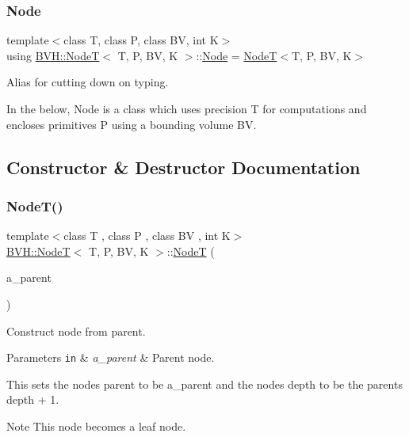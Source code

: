 \subsubsection{\texorpdfstring{Node}{Node}}
{\footnotesize\ttfamily template$<$class T, class P, class BV, int K$>$ \\
using \hyperlink{classBVH_1_1NodeT}{B\+V\+H\+::\+NodeT}$<$ T, P, BV, K $>$\+::\hyperlink{classBVH_1_1NodeT_ac52d9b56f082002c7f8be91062c40ff8}{Node} =  \hyperlink{classBVH_1_1NodeT}{NodeT}$<$T, P, BV, K$>$}



Alias for cutting down on typing. 

In the below, \textquotesingle{}Node\textquotesingle{} is a class which uses precision T for computations and encloses primitives P using a bounding volume BV. 

\subsection{Constructor \& Destructor Documentation}
\mbox{\label{classBVH_1_1NodeT_a8867e5e1c47d12eff7a468b2e240f16b}} 
\subsubsection{\texorpdfstring{Node\+T()}{NodeT()}\hspace{0.1cm}{\footnotesize\ttfamily [1/3]}}
{\footnotesize\ttfamily template$<$class T , class P , class BV , int K$>$ \\
\hyperlink{classBVH_1_1NodeT}{B\+V\+H\+::\+NodeT}$<$ T, P, BV, K $>$\+::\hyperlink{classBVH_1_1NodeT}{NodeT} (\begin{DoxyParamCaption}\item[{const \hyperlink{classBVH_1_1NodeT_a008f5c2c53adb1f5730d8478b48529b1}{Node\+Ptr} \&}]{a\+\_\+parent }\end{DoxyParamCaption})\hspace{0.3cm}{\ttfamily [inline]}}



Construct node from parent. 


\begin{DoxyParams}[1]{Parameters}
\mbox{\tt in}  & {\em a\+\_\+parent} & Parent node.\\
\hline
\end{DoxyParams}
This sets the node\textquotesingle{}s parent to be a\+\_\+parent and the node\textquotesingle{}s depth to be the parent\textquotesingle{}s depth + 1. \begin{DoxyNote}{Note}
This node becomes a leaf node. 
\end{DoxyNote}
\mbox{\label{classBVH_1_1NodeT_a6da86ccc8e4a0c556cd67ca59af983dc}} 
